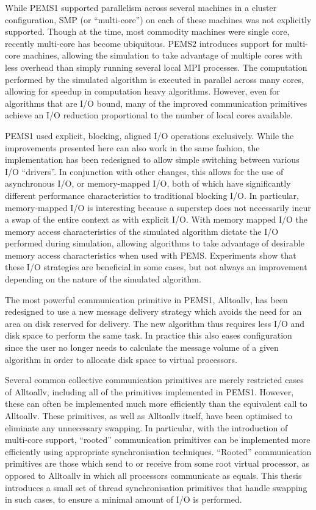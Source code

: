\documentclass[12pt]{carletoncsthesis}
\begin{document}
While PEMS1 supported parallelism across several machines in a cluster
configuration, SMP (or ``multi-core'') on each of these machines was not
explicitly supported.  Though at the time, most commodity machines were
single core, recently multi-core has become ubiquitous.  PEMS2 introduces
support for multi-core machines, allowing the simulation to take advantage
of multiple cores with less overhead than simply running several local
MPI processes.  The computation performed by the simulated algorithm is
executed in parallel across many cores, allowing for speedup in computation
heavy algorithms.  However, even for algorithms that are I/O bound, many of
the improved communication primitives achieve an I/O reduction proportional
to the number of local cores available.

PEMS1 used explicit, blocking, aligned I/O operations exclusively.
While the improvements presented here can also work in the same fashion,
the implementation has been redesigned to allow simple switching between
various I/O ``drivers''.  In conjunction with other changes, this allows
for the use of asynchronous I/O, or memory-mapped I/O, both of which have
significantly different performance characteristics to traditional blocking
I/O.  In particular, memory-mapped I/O is interesting because a superstep
does not necessarily incur a swap of the entire context as with explicit I/O.
With memory mapped I/O the memory access characteristics of the simulated
algorithm dictate the I/O performed during simulation, allowing algorithms to
take advantage of desirable memory access characteristics when used with PEMS.
Experiments show that these I/O strategies are beneficial in some cases, but
not always an improvement depending on the nature of the simulated algorithm.

The most powerful communication primitive in PEMS1, {\sc Alltoallv}, has been
redesigned to use a new message delivery strategy which avoids the need for
an area on disk reserved for delivery.  The new algorithm thus requires less
I/O and disk space to perform the same task.  In practice this also eases
configuration since the user no longer needs to calculate the message volume
of a given algorithm in order to allocate disk space to virtual processors.

Several common collective communication primitives are merely restricted cases
of Alltoallv, including all of the primitives implemented in PEMS1.  However,
these can often be implemented much more efficiently than the equivalent
call to Alltoallv.  These primitives, as well as Alltoallv itself, have been
optimised to eliminate any unnecessary swapping.  In particular, with the
introduction of multi-core support, ``rooted'' communication primitives can be
implemented more efficiently using appropriate synchronisation techniques.
``Rooted'' communication primitives are those which send to or receive
from some root virtual processor, as opposed to Alltoallv in which all
processors communicate as equals.  This thesis introduces a small set of thread
synchronisation primitives that handle swapping in such cases, to ensure a
minimal amount of I/O is performed.
\end{document}
